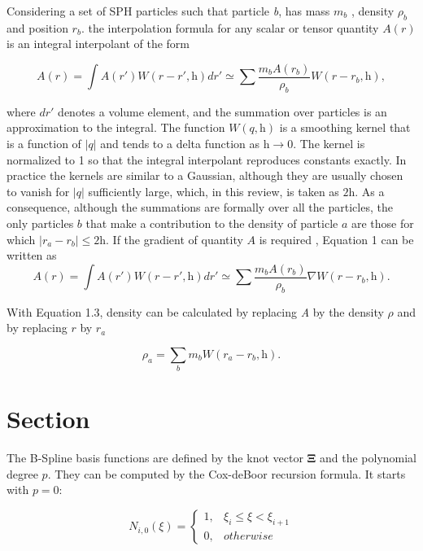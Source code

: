 Considering a set of SPH particles \cite{monaghan_smoothed_2012} such that particle \textit{b}, has mass $m_{b}$ , density $\rho_{b}$ and position $r_{b}$. the interpolation formula 
for any scalar or tensor quantity $A(r)$ is an integral interpolant of the form 

\begin{equation} 
A(r) = \int A(r')W(r-r',\textit{h})dr' \simeq \sum \frac{m_{b}A(r_{b})}{\rho_{b}}W(r-r_{b},\textit{h}),
\end{equation}

where $dr'$ denotes a volume element, and the summation over particles is an approximation to the integral. The function $W(q,\textit{h})$ is a smoothing kernel that is a function of
$|q|$ and tends to a delta function as $\textit{h}\rightarrow 0$.  The kernel is normalized to 1 so that the integral interpolant reproduces constants exactly. In practice the kernels 
are similar to a Gaussian, although they are usually chosen to vanish for $|q|$ sufficiently large, which, in this review, is taken as $2\textit{h}$. As a consequence, although the 
summations are formally over all the particles, the only particles $\textit{b}$ that make a contribution to the density of particle $\textit{a}$ are those for which 
$|r_{a}-r_{b}|\leq 2\textit{h}$. If the gradient of quantity $A$ is required , Equation 1 can be written as
\begin{equation} 
A(r) = \int A(r')W(r-r',\textit{h})dr' \simeq \sum \frac{m_{b}A(r_{b})}{\rho_{b}}\nabla W(r-r_{b},\textit{h}).
\end{equation}

With Equation 1.3, density can be calculated by replacing \textit{A} by the density $\rho$ and by replacing $r$ by $r_{a}$

\begin{equation}
\rho_{a} = \sum_{b} m_{b}W(r_{a}-r_{b},\textit{h}).
\end{equation}


\section{Section}
\label{sec:section 2}


The B-Spline basis functions are defined by the knot vector $\mathbf{\Xi}$ and the polynomial degree $p$. They can be computed by the Cox-deBoor recursion formula. It starts with $p=0$: 

\begin{equation}
			N_{i,0}(\xi)=\begin{cases}
		  1,  & \xi_i \leqslant \xi < \xi_{i+1}\\
		  0, & otherwise
		\end{cases}
	\label{eq:CoxPnull}
\end{equation}

